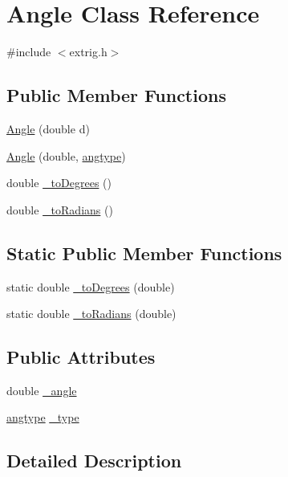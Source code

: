 \hypertarget{class_angle}{}\section{Angle Class Reference}
\label{class_angle}


{\ttfamily \#include $<$extrig.\+h$>$}

\subsection*{Public Member Functions}
\begin{DoxyCompactItemize}
\item 
\hyperlink{class_angle_ae97e37d95b28e75761e6eb2d2867d1cd}{Angle} (double d)
\item 
\hyperlink{class_angle_a8f8d960df2877c91e894f232280b93c3}{Angle} (double, \hyperlink{extrig_8h_a197e10a031deebf2be36caacae73793c}{angtype})
\item 
double \hyperlink{class_angle_a12c9e4078d0f783683d8abfd99c50e84}{\+\_\+to\+Degrees} ()
\item 
double \hyperlink{class_angle_a346489f0d605b77f232187b95ee8196d}{\+\_\+to\+Radians} ()
\end{DoxyCompactItemize}
\subsection*{Static Public Member Functions}
\begin{DoxyCompactItemize}
\item 
static double \hyperlink{class_angle_a573ca47927315db6d1ee5530285b2ee2}{\+\_\+to\+Degrees} (double)
\item 
static double \hyperlink{class_angle_a7ad649491bfb9c6f641300d2630d09c9}{\+\_\+to\+Radians} (double)
\end{DoxyCompactItemize}
\subsection*{Public Attributes}
\begin{DoxyCompactItemize}
\item 
double \hyperlink{class_angle_a0020e88f3886809c93dbb7debc689c51}{\+\_\+angle}
\item 
\hyperlink{extrig_8h_a197e10a031deebf2be36caacae73793c}{angtype} \hyperlink{class_angle_a4f2ca93e511d9ba985574464b4899355}{\+\_\+type}
\end{DoxyCompactItemize}


\subsection{Detailed Description}


